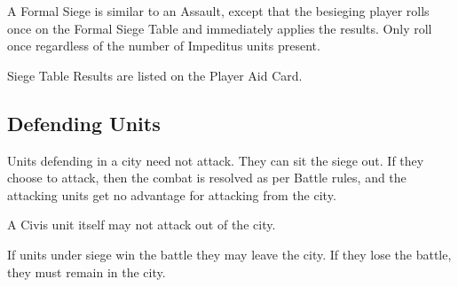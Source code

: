 A Formal Siege is similar to an Assault, except that the besieging player rolls once on the Formal Siege Table and immediately applies the results. Only roll once regardless of the number of Impeditus units present.

Siege Table Results are listed on the Player Aid Card.

\subsection{Defending Units}

Units defending in a city need not attack. They can sit the siege out. If they choose to attack, then the combat is resolved as per Battle rules, and the attacking units get no advantage for attacking from the city.

A Civis unit itself may not attack out of the city.

If units under siege win the battle they may leave the city. If they lose the battle, they must remain in the city.